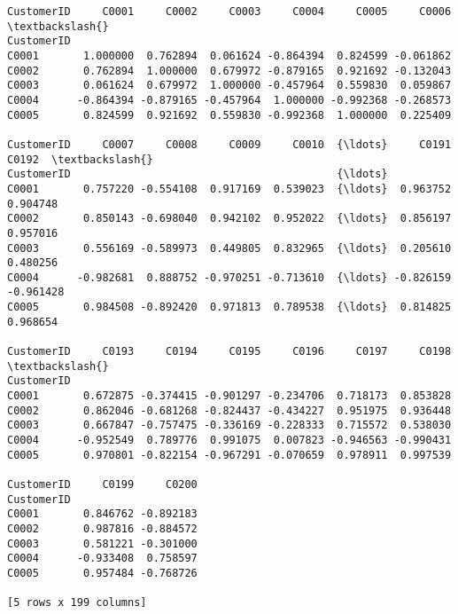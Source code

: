 \documentclass[11pt]{article}
\begin{document}
    \begin{Verbatim}[commandchars=\\\{\}]
CustomerID     C0001     C0002     C0003     C0004     C0005     C0006  \textbackslash{}
CustomerID
C0001       1.000000  0.762894  0.061624 -0.864394  0.824599 -0.061862
C0002       0.762894  1.000000  0.679972 -0.879165  0.921692 -0.132043
C0003       0.061624  0.679972  1.000000 -0.457964  0.559830  0.059867
C0004      -0.864394 -0.879165 -0.457964  1.000000 -0.992368 -0.268573
C0005       0.824599  0.921692  0.559830 -0.992368  1.000000  0.225409

CustomerID     C0007     C0008     C0009     C0010  {\ldots}     C0191     C0192  \textbackslash{}
CustomerID                                          {\ldots}
C0001       0.757220 -0.554108  0.917169  0.539023  {\ldots}  0.963752  0.904748
C0002       0.850143 -0.698040  0.942102  0.952022  {\ldots}  0.856197  0.957016
C0003       0.556169 -0.589973  0.449805  0.832965  {\ldots}  0.205610  0.480256
C0004      -0.982681  0.888752 -0.970251 -0.713610  {\ldots} -0.826159 -0.961428
C0005       0.984508 -0.892420  0.971813  0.789538  {\ldots}  0.814825  0.968654

CustomerID     C0193     C0194     C0195     C0196     C0197     C0198  \textbackslash{}
CustomerID
C0001       0.672875 -0.374415 -0.901297 -0.234706  0.718173  0.853828
C0002       0.862046 -0.681268 -0.824437 -0.434227  0.951975  0.936448
C0003       0.667847 -0.757475 -0.336169 -0.228333  0.715572  0.538030
C0004      -0.952549  0.789776  0.991075  0.007823 -0.946563 -0.990431
C0005       0.970801 -0.822154 -0.967291 -0.070659  0.978911  0.997539

CustomerID     C0199     C0200
CustomerID
C0001       0.846762 -0.892183
C0002       0.987816 -0.884572
C0003       0.581221 -0.301000
C0004      -0.933408  0.758597
C0005       0.957484 -0.768726

[5 rows x 199 columns]
    \end{Verbatim}
\end{document}
